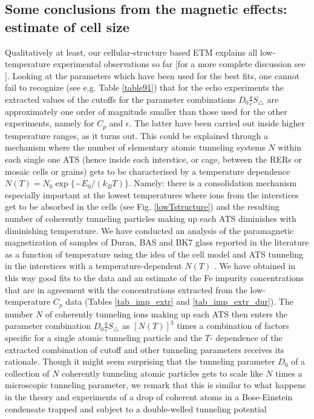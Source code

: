 \documentclass[10pt]{article}
\begin{document}
\subsection{Some conclusions from the magnetic effects: estimate of cell size}
Qualitatively at least, our cellular-structure based ETM explains all low-temperature 
experimental observations so far [for a more complete discussion see \cite{JBK2016}]. 
Looking at the parameters which have been used for the best fits, one cannot fail to 
recognize (see e.g. Table \ref{table91}) that for the echo experiments the extracted 
values of the cutoffs for the parameter combinations $D_0\frac{q}{e}S_{\triangle}$ 
are approximately one order of magnitude smaller than those used for the other 
experiments, namely for $C_p$ and $\epsilon$. The latter have been carried out 
inside higher temperature ranges, as it turns out. This could be explained through 
a mechanism where the number of elementary atomic tunneling systems $N$ within 
each single one ATS (hence inside each interstice, or cage, between the RERs or 
mosaic cells or grains) gets to be characterised by a temperature dependence 
$N(T)=N_0\exp\{-E_0/(k_BT)\}$. Namely: there is a consolidation mechanism 
especially important at the lowest temperatures where ions from the interstices get to 
be absorbed in the cells (see Fig. \ref{lowTstructure}) and the resulting number of 
coherently tunneling particles making up each 
ATS diminishes with diminishing temperature. We have conducted an analysis of the
paramagnetic magnetization of samples of Duran, BAS and BK7 glass reported in the
literature as a function of temperature using the idea of the cell model and ATS 
tunneling in the interstices with a temperature-dependent $N(T)$ \cite{Bon2015}. 
We have obtained in this way good fits to the data and an estimate of the Fe impurity 
concentrations that are in agreement with the concentrations extracted from the 
low-temperature $C_p$ data (Tables \ref{tab_imp_extr} and \ref{tab_imp_extr_dur}).
The number $N$ of coherently tunneling ions making up each ATS then enters the 
parameter combination $D_0\frac{q}{e}S_{\triangle}$ as $[N(T)]^3$ times a 
combination of factors specific for a single atomic tunneling particle and the $T$-
dependence of the extracted combination of cutoff and other tunneling parameters
receives its rationale. Though it might seem surprising that the tunneling parameter 
$D_0$ of a collection of $N$ coherently tunneling atomic particles gets to scale like 
$N$ times a microscopic tunneling parameter, we remark that this is similar to what 
happens in the theory and experiments of a drop of coherent atoms in a Bose-Einstein 
condensate trapped and subject to a double-welled tunneling potential \cite{BE1,BE2}
\end{document}
